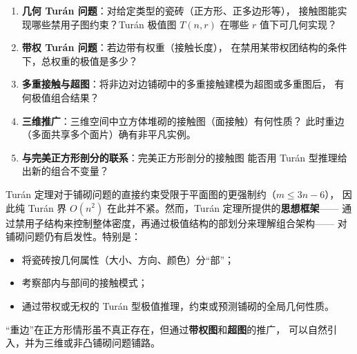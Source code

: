 \documentclass[12pt,a4paper]{article}
\theoremstyle{plain}
\theoremstyle{definition}
\theoremstyle{remark}
\begin{document}
\begin{enumerate}[label=\textbf{Q\arabic*}.]
    \item \textbf{几何 Turán 问题}：对给定类型的瓷砖（正方形、正多边形等），
    接触图能实现哪些禁用子图约束？Turán 极值图 $T(n,r)$ 在哪些 $r$ 值下可几何实现？
    
    \item \textbf{带权 Turán 问题}：若边带有权重（接触长度），
    在禁用某带权团结构的条件下，总权重的极值是多少？
    
    \item \textbf{多重接触与超图}：将非边对边铺砌中的多重接触建模为超图或多重图后，
    有何极值组合结果？
    
    \item \textbf{三维推广}：三维空间中立方体堆砌的接触图（面接触）有何性质？
    此时重边（多面共享多个面片）确有非平凡实例。
    
    \item \textbf{与完美正方形剖分的联系}：完美正方形剖分的接触图
    能否用 Turán 型推理给出新的组合不变量？
\end{enumerate}

\vspace{1cm}
\begin{tcolorbox}[title=初步结论]
Turán 定理对于铺砌问题的直接约束受限于平面图的更强制约（$m \le 3n-6$），
因此纯 Turán 界 $O(n^2)$ 在此并不紧。然而，Turán 定理所提供的\textbf{思想框架}——
通过禁用子结构来控制整体密度，再通过极值结构的部划分来理解组合架构——
对铺砌问题仍有启发性。特别是：
\begin{itemize}
    \item 将瓷砖按几何属性（大小、方向、颜色）分``部''；
    \item 考察部内与部间的接触模式；
    \item 通过带权或无权的 Turán 型极值推理，约束或预测铺砌的全局几何性质。
\end{itemize}
``重边''在正方形情形虽不真正存在，但通过\textbf{带权图}和\textbf{超图}的推广，
可以自然引入，并为三维或非凸铺砌问题铺路。
\end{tcolorbox}
\end{document}
